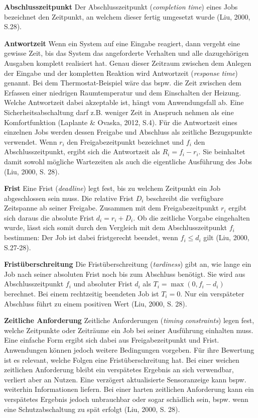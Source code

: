 \textbf{Abschlusszeitpunkt }Der Abschlusszeitpunkt (\emph{completion time}) eines Jobs bezeichnet den Zeitpunkt, an welchem dieser fertig umgesetzt wurde (Liu, 2000, S.28).

\textbf{Antwortzeit} Wenn ein System auf eine Eingabe reagiert, dann vergeht eine gewisse Zeit, bis das System das angeforderte Verhalten und alle dazugehörigen Ausgaben komplett realisiert hat. Genau dieser Zeitraum zwischen dem Anlegen der Eingabe und der kompletten Reaktion wird Antwortzeit (\emph{response} \emph{time}) genannt. Bei dem Thermostat-Beispiel wäre das bspw. die Zeit zwischen dem Erfassen einer niedrigen Raumtemperatur und dem Einschalten der Heizung. Welche Antwortzeit dabei akzeptable ist, hängt vom Anwendungsfall ab. Eine Sicherheitsabschaltung darf z.B. weniger Zeit in Anspruch nehmen als eine Komfortfunktion (Laplante \& Ovaska, 2012, S.4). Für die Antwortzeit eines einzelnen Jobs werden dessen Freigabe und Abschluss als zeitliche Bezugspunkte verwendet. Wenn \(r_i\) den Freigabezeitpunkt bezeichnet und \(f_i\) den Abschlusszeitpunkt, ergibt sich die Antwortzeit als \(R_i = f_i - r_i\). Sie beinhaltet damit sowohl mögliche Wartezeiten als auch die eigentliche Ausführung des Jobs (Liu, 2000, S. 28).

\textbf{Frist }Eine Frist (\emph{deadline}) legt fest, bis zu welchem Zeitpunkt ein Job abgeschlossen sein muss. Die relative Frist \(D_i\) beschreibt die verfügbare Zeitspanne ab seiner Freigabe. Zusammen mit dem Freigabezeitpunkt \(r_i\) ergibt sich daraus die absolute Frist \(d_i = r_i + D_i\). Ob die zeitliche Vorgabe eingehalten wurde, lässt sich somit durch den Vergleich mit dem Abschlusszeitpunkt \(f_i\) bestimmen: Der Job ist dabei fristgerecht beendet, wenn \(f_i \leq d_i\) gilt (Liu, 2000, S.27-28).

\textbf{Fristüberschreitung }Die Fristüberschreitung (\emph{tardiness}) gibt an, wie lange ein Job nach seiner absoluten Frist noch bis zum Abschluss benötigt. Sie wird aus Abschlusszeitpunkt \(f_i\) und absoluter Frist \(d_i\) als \(T_i = \max(0, f_i - d_i)\) berechnet. Bei einem rechtzeitig beendeten Job ist \(T_i = 0\). Nur ein verspäteter Abschluss führt zu einem positiven Wert (Liu, 2000, S. 28).

\textbf{Zeitliche Anforderung} Zeitliche Anforderungen (\emph{timing} \emph{constraints}) legen fest, welche Zeitpunkte oder Zeiträume ein Job bei seiner Ausführung einhalten muss. Eine einfache Form ergibt sich dabei aus Freigabezeitpunkt und Frist. Anwendungen können jedoch weitere Bedingungen vorgeben. Für ihre Bewertung ist es relevant, welche Folgen eine Fristüberschreitung hat. Bei einer weichen zeitlichen Anforderung bleibt ein verspätetes Ergebnis an sich verwendbar, verliert aber an Nutzen. Eine verzögert aktualisierte Sensoranzeige kann bspw. weiterhin Informationen liefern. Bei einer harten zeitlichen Anforderung kann ein verspätetes Ergebnis jedoch unbrauchbar oder sogar schädlich sein, bspw. wenn eine Schutzabschaltung zu spät erfolgt (Liu, 2000, S. 28).

